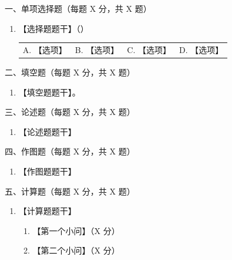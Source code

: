 \documentclass[a4paper,10pt]{article}
\newcommand{\examsection}[1]{%
    \par\addvspace{0.3cm}%
    {\Large #1\par}%
    \nopagebreak[4]\vspace{0.4cm}%
}
\begin{document}
\examsection{一、单项选择题（每题 X 分，共 X 题）}
\begin{enumerate}
    \item 【选择题题干】（\qquad）
    \par\vspace{0.2cm}
    \begin{tabularx}{\linewidth}{@{}*{4}{>{\raggedright\arraybackslash}X}@{}}
        A. 【选项】 & B. 【选项】 & C. 【选项】 & D. 【选项】
    \end{tabularx}
\end{enumerate}

\examsection{二、填空题（每题 X 分，共 X 题）}
\begin{enumerate}[itemsep=0.2cm]
    \item 【填空题题干】\underline{\hspace{3cm}}。
\end{enumerate}

\examsection{三、论述题（每题 X 分，共 X 题）}
\begin{enumerate}
    \item 【论述题题干】
    \par\vspace*{3cm} %
\end{enumerate}

\examsection{四、作图题（每题 X 分，共 X 题）}
\begin{enumerate}
    \item 【作图题题干】
    \par\vspace*{4cm}
\end{enumerate}

\examsection{五、计算题（每题 X 分，共 X 题）}
\begin{enumerate}
    \item 【计算题题干】
    \begin{enumerate}[label=(\arabic*),leftmargin=2em,itemsep=0.15cm]
        \item 【第一个小问】（X 分）
        \item 【第二个小问】（X 分）
    \end{enumerate}
    \par\vspace*{5cm}
\end{enumerate}

\end{document}
